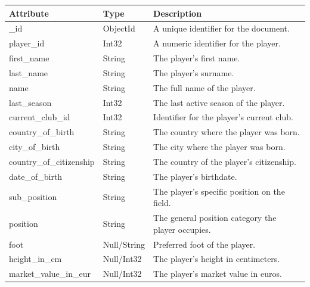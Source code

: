 \documentclass{Configuration_Files/PoliMi3i_thesis}
\begin{document}
\begin{tabular}{|l|l|p{8cm}|}
    \hline
    \rowcolor{bluepoli!40}
    \textbf{Attribute}             & \textbf{Type}            & \textbf{Description} \\ \hline
    \_id                           & ObjectId                 & A unique identifier for the document. \\ \hline
    player\_id                     & Int32                    & A numeric identifier for the player. \\ \hline
    first\_name                    & String                   & The player's first name. \\ \hline
    last\_name                     & String                   & The player's surname. \\ \hline
    name                           & String                   & The full name of the player. \\ \hline
    last\_season                   & Int32                    & The last active season of the player. \\ \hline
    current\_club\_id              & Int32                    & Identifier for the player's current club. \\ \hline
    country\_of\_birth             & String                   & The country where the player was born. \\ \hline
    city\_of\_birth                & String                   & The city where the player was born. \\ \hline
    country\_of\_citizenship       & String                   & The country of the player's citizenship. \\ \hline
    date\_of\_birth                & String                   & The player's birthdate. \\ \hline
    sub\_position                  & String                   & The player's specific position on the field. \\ \hline
    position                       & String                   & The general position category the player occupies. \\ \hline
    foot                           & Null/String              & Preferred foot of the player. \\ \hline
    height\_in\_cm                 & Null/Int32               & The player's height in centimeters. \\ \hline
    market\_value\_in\_eur         & Null/Int32               & The player's market value in euros. \\ \hline

\end{tabular}
\end{document}
